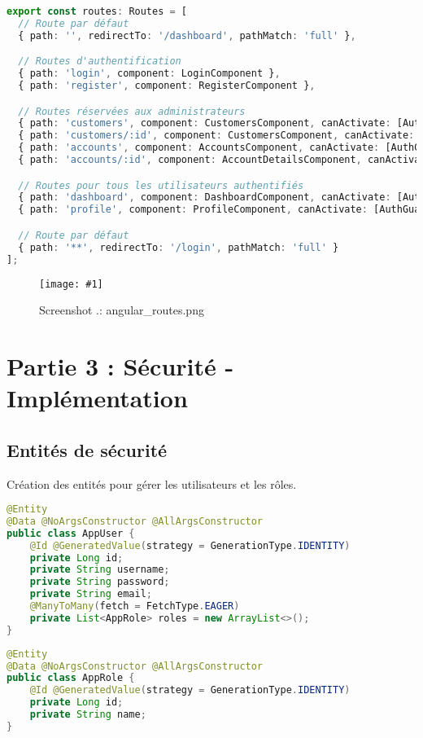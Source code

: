 \documentclass[12pt,a4paper]{report}
\newcounter{screenshotcounter}[chapter]
\newcommand{\screenshot}[2]{
  \stepcounter{screenshotcounter}
  \begin{figure}[H]
    \centering
    \texttt{[image: \#1]}
    \caption{Screenshot \thechapter.\thescreenshotcounter: #1}
    \label{fig:#1}
  \end{figure}
}
\begin{document}
\begin{lstlisting}[language=TypeScript, caption=app.routes.ts]
export const routes: Routes = [
  // Route par défaut
  { path: '', redirectTo: '/dashboard', pathMatch: 'full' },

  // Routes d'authentification
  { path: 'login', component: LoginComponent },
  { path: 'register', component: RegisterComponent },

  // Routes réservées aux administrateurs
  { path: 'customers', component: CustomersComponent, canActivate: [AuthGuard, AdminGuard] },
  { path: 'customers/:id', component: CustomersComponent, canActivate: [AuthGuard, AdminGuard] },
  { path: 'accounts', component: AccountsComponent, canActivate: [AuthGuard, AdminGuard] },
  { path: 'accounts/:id', component: AccountDetailsComponent, canActivate: [AuthGuard, AdminGuard] },

  // Routes pour tous les utilisateurs authentifiés
  { path: 'dashboard', component: DashboardComponent, canActivate: [AuthGuard] },
  { path: 'profile', component: ProfileComponent, canActivate: [AuthGuard] },

  // Route par défaut
  { path: '**', redirectTo: '/login', pathMatch: 'full' }
];
\end{lstlisting}

\screenshot{angular_routes.png}{0.8} %

\chapter{Partie 3 : Sécurité - Implémentation}

\section{Entités de sécurité}
Création des entités pour gérer les utilisateurs et les rôles.

\begin{lstlisting}[language=Java, caption=AppUser.java]
@Entity
@Data @NoArgsConstructor @AllArgsConstructor
public class AppUser {
    @Id @GeneratedValue(strategy = GenerationType.IDENTITY)
    private Long id;
    private String username;
    private String password;
    private String email;
    @ManyToMany(fetch = FetchType.EAGER)
    private List<AppRole> roles = new ArrayList<>();
}
\end{lstlisting}

\begin{lstlisting}[language=Java, caption=AppRole.java]
@Entity
@Data @NoArgsConstructor @AllArgsConstructor
public class AppRole {
    @Id @GeneratedValue(strategy = GenerationType.IDENTITY)
    private Long id;
    private String name;
}
\end{lstlisting}
\end{document}
